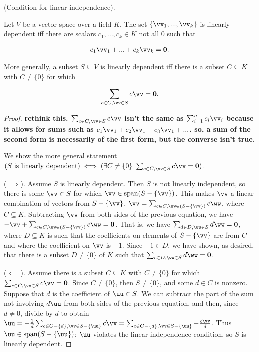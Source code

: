 \begin{theorem}
    (Condition for linear independence).
    
    Let $V$ be a vector space over a field $K$. The set $\{\vv_1, ..., \vv_k\}$ is linearly dependent iff there are scalars $c_1, ..., c_k \in K$ not all $0$ such that
    
    \begin{align*}
        c_1 \vv_1 + ... + c_k \vv_k = \mathbf{0}.
    \end{align*}
    
    More generally, a subset $S \subseteq V$ is linearly dependent iff there is a subset $C \subseteq K$ with $C \neq \{0\}$ for which
    
    \begin{align*}
        \sum_{c \in C, \vv \in S} c \vv = \mathbf{0}.
    \end{align*}
\end{theorem}

\begin{proof}   
   \textbf{rethink this. $\sum_{c \in C, \vv \in S} c \vv$ isn't the same as $\sum_{i = 1}^n c_i \vv_i$ because it allows for sums such as $c_1 \vv_1 + c_2 \vv_1 + c_3 \vv_1 + ...$. so, a sum of the second form is necessarily of the first form, but the converse isn't true.}
   
   We show the more general statement $(\text{$S$ is linearly dependent}) \iff (\exists C \neq \{0\} \spc \sum_{c \in C, \vv \in S} c \vv = \mathbf{0})$.
   
   ($\implies$). Assume $S$ is linearly dependent. Then $S$ is not linearly independent, so there is some $\vv \in S$ for which $\vv \in \spann(S - \{\vv\})$. This makes $\vv$ a linear combination of vectors from $S - \{\vv\}$, $\vv = \sum_{c \in C, \ww \in (S - \{\vv\})} c \ww$, where $C \subseteq K$. Subtracting $\vv$ from both sides of the previous equation, we have $-\vv + \sum_{c \in C, \ww \in (S - \{\vv\})} c \ww = \mathbf{0}$. That is, we have $\sum_{d \in D, \ww \in S} d \ww = \mathbf{0}$, where $D \subseteq K$ is such that the coefficients on elements of $S - \{\vv\}$ are from $C$ and where the coefficient on $\vv$ is $-1$. Since $-1 \in D$, we have shown, as desired, that there is a subset $D \neq \{0\}$ of $K$ such that $\sum_{c \in D, \ww \in S} d \ww = \mathbf{0}$.
   
   ($\impliedby$). Assume there is a subset $C \subseteq K$ with $C \neq \{0\}$ for which $\sum_{c \in C, \vv \in S} c \vv = \mathbf{0}$. Since $C \neq \{0\}$, then $S \neq \{0\}$, and some $d \in C$ is nonzero. Suppose that $d$ is the coefficient of $\uu \in S$. We can subtract the part of the sum not involving $d \uu$ from both sides of the previous equation, and then, since $d \neq 0$,  divide by $d$ to obtain $\uu = -\frac{1}{d}\sum_{c \in C - \{d\}, \vv \in S - \{\uu\}} c \vv = \sum_{c \in C - \{d\}, \vv \in S - \{\uu\}} - \frac{c \vv}{d}$. Thus $\uu \in \spann(S - \{\uu\})$; $\uu$ violates the linear independence condition, so $S$ is linearly dependent.
\end{proof}

